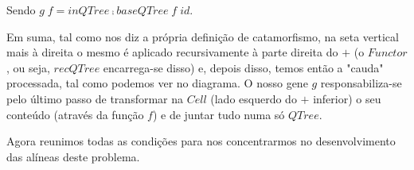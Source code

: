 \documentclass[a4paper]{article}
\newcommand{\Conid}[1]{\mathit{#1}}
\newcommand{\Varid}[1]{\mathit{#1}}
\begin{document}
Sendo \ensuremath{\Varid{g}\;\Varid{f}\mathrel{=}\Varid{inQTree}\comp \Varid{baseQTree}\;\Varid{f}\;\Varid{id}}.

Em suma, tal como nos diz a própria definição de
catamorfismo, na seta vertical mais à direita o mesmo é aplicado recursivamente
à parte direita do \ensuremath{\mathbin{+}} (o \ensuremath{\Conid{Functor}}, ou seja, \ensuremath{\Varid{recQTree}} encarrega-se disso) e,
depois disso, temos então a "cauda" processada, tal como podemos ver no diagrama.
O nosso gene \ensuremath{\Varid{g}}
responsabiliza-se pelo último passo de transformar na \ensuremath{\Conid{Cell}} (lado
esquerdo do \ensuremath{\mathbin{+}} inferior) o seu conteúdo (através da função \ensuremath{\Varid{f}}) e de juntar tudo numa só
\ensuremath{\Conid{QTree}}.

\vspace{0.3cm}

Agora reunimos todas as condições para nos concentrarmos no desenvolvimento das
alíneas deste problema.
\end{document}
